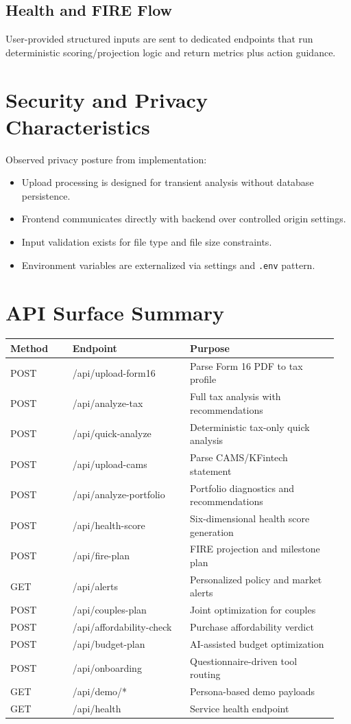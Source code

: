 \documentclass[12pt,a4paper]{article}
\begin{document}
\subsection{Health and FIRE Flow}
User-provided structured inputs are sent to dedicated endpoints that run deterministic scoring/projection logic and return metrics plus action guidance.

\section{Security and Privacy Characteristics}
Observed privacy posture from implementation:
\begin{itemize}
	\item Upload processing is designed for transient analysis without database persistence.
	\item Frontend communicates directly with backend over controlled origin settings.
	\item Input validation exists for file type and file size constraints.
	\item Environment variables are externalized via settings and \texttt{.env} pattern.
\end{itemize}

\section{API Surface Summary}
\begin{longtable}{p{0.18\linewidth} p{0.34\linewidth} p{0.43\linewidth}}
\toprule
\textbf{Method} & \textbf{Endpoint} & \textbf{Purpose} \\
\midrule
POST & /api/upload-form16 & Parse Form 16 PDF to tax profile \\
POST & /api/analyze-tax & Full tax analysis with recommendations \\
POST & /api/quick-analyze & Deterministic tax-only quick analysis \\
POST & /api/upload-cams & Parse CAMS/KFintech statement \\
POST & /api/analyze-portfolio & Portfolio diagnostics and recommendations \\
POST & /api/health-score & Six-dimensional health score generation \\
POST & /api/fire-plan & FIRE projection and milestone plan \\
GET & /api/alerts & Personalized policy and market alerts \\
POST & /api/couples-plan & Joint optimization for couples \\
POST & /api/affordability-check & Purchase affordability verdict \\
POST & /api/budget-plan & AI-assisted budget optimization \\
POST & /api/onboarding & Questionnaire-driven tool routing \\
GET & /api/demo/* & Persona-based demo payloads \\
GET & /api/health & Service health endpoint \\
\bottomrule
\end{longtable}
\end{document}

